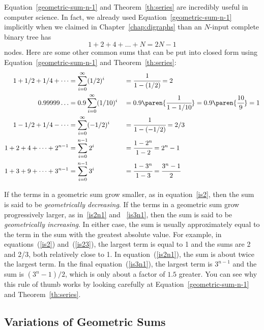 Equation~\ref{geometric-sum-n-1} and Theorem~\ref{th:series} are
incredibly useful in computer science.  In fact, we already used
Equation~\ref{geometric-sum-n-1} implicitly when we claimed in
Chapter~\ref{chap:digraphs} than an $N$-input complete binary tree
has
\begin{equation*}
    1 + 2 + 4 + \dots + N = 2 N - 1
\end{equation*}
nodes.  Here are some other common sums that can be put into closed
form using Equation~\ref{geometric-sum-n-1} and
Theorem~\ref{th:series}:
\begin{alignat}{3}
1 + 1/2 + 1/4 + \cdots
    & = \sum_{i=0}^\infty (1/2)^i
    &%
    & = \cfrac{1}{1-(1/2)} = 2 \label{is2}
\\
0.99999\dots
    & = 0.9 \sum_{i=0}^{\infty} (1/10)^i
    &
    & = 0.9 \paren{\cfrac{1}{1-1/10}}
      = 0.9 \paren{\cfrac{10}{9}}
      = 1 \label{is1}
\\
1 - 1/2 + 1/4 - \cdots
    & = \sum_{i=0}^\infty (-1/2)^i
    &
    & = \cfrac{1}{1-(-1/2)}
      = 2/3 \label{is23}
\\
1 + 2 + 4 + \cdots + 2^{n-1}
    & = \sum_{i=0}^{n-1} 2^i
    &
    & = \cfrac{1 - 2^n}{1 - 2}
      = 2^n - 1 \label{is2n1}
\\
1 + 3 + 9 + \cdots + 3^{n-1}
    & = \sum_{i=0}^{n-1} 3^i
    &
    & = \cfrac{1 - 3^n}{1 - 3}
      = \cfrac{3^n - 1}{2} \label{is3n1}
\end{alignat}

If the terms in a geometric sum grow smaller, as in
equation~\eqref{is2}, then the sum is said to be \emph{geometrically
  decreasing}.  If the terms in a geometric sum grow progressively
larger, as in~\eqref{is2n1} and ~\eqref{is3n1}, then the sum is said
to be \emph{geometrically increasing}.  In either case, the sum is
usually approximately equal to the term in the sum with the greatest
absolute value.  For example, in equations~(\ref{is2})
and~(\ref{is23}), the largest term is equal to 1 and the sums are 2
and 2/3, both relatively close to 1.  In equation~(\ref{is2n1}), the
sum is about twice the largest term.  In the final
equation~(\ref{is3n1}), the largest term is $3^{n-1}$ and the sum is
$(3^n-1)/2$, which is only about a factor of $1.5$ greater.  You can
see why this rule of thumb works by looking carefully at
Equation~\ref{geometric-sum-n-1} and Theorem~\ref{th:series}.

\subsection{Variations of Geometric Sums}


